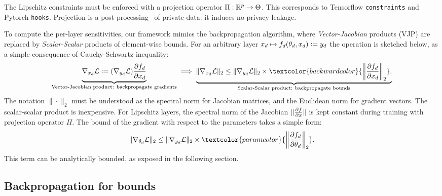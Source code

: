     \begin{requirement}\label{req:pgd}
        The Lipschitz constraints must be enforced with a projection operator $\Pi:\mathbb{R}^p\rightarrow\Theta$. This corresponds to Tensorflow \lstinline[basicstyle=\ttfamily, backgroundcolor=\color{gray!20}]{constraints} and Pytorch \lstinline[basicstyle=\ttfamily, backgroundcolor=\color{gray!20}]{hooks}. Projection is a post-processing~\citep{dwork2006calibrating} of private data: it induces no privacy leakage. 
    \end{requirement}

 
To compute the per-layer sensitivities, our framework mimics the backpropagation algorithm, where \textit{Vector-Jacobian} products (VJP) are replaced by \textit{Scalar-Scalar} products of element-wise bounds. For an arbitrary layer $x_d\mapsto f_d(\theta_d,x_d) \vcentcolon= y_d$ the operation is sketched below, as a simple consequence of Cauchy-Schwartz inequality:
\begin{align}
    \underbrace{\nabla_{x_d}\Loss\defeq(\nabla_{y_d}\Loss)\Jac{f_d}{x_d}}_{\text{Vector-Jacobian product: backpropagate gradients}} \implies  \underbrace{\|\nabla_{x_d}\Loss\|_2\leq \|\nabla_{y_d}\Loss\|_2\times \textcolor{backwardcolor}{\left\|\Jac{f_d}{x_d}\right\|_2}.}_{\text{Scalar-Scalar product: backpropagate bounds}}
\end{align}
The notation $\|\cdot\|_2$ must be understood as the spectral norm for Jacobian matrices, and the Euclidean norm for gradient vectors. The scalar-scalar product is inexpensive. For Lipschitz layers, the spectral norm of the Jacobian $\|\frac{\partial f}{\partial x}\|$ is kept constant during training with projection operator $\Pi$. 
The bound of the gradient with respect to the parameters takes a simple form:
\begin{equation}\label{eq:boundparams}
    \|\nabla_{\theta_d}\Loss\|_2\leq\|\nabla_{y_d}\Loss\|_2\times \textcolor{paramcolor}{\left\|\Jac{f_d}{\theta_d}\right\|_2}.
\end{equation}
This term can be analytically bounded, as exposed in the following section.

\subsection{Backpropagation for bounds}

